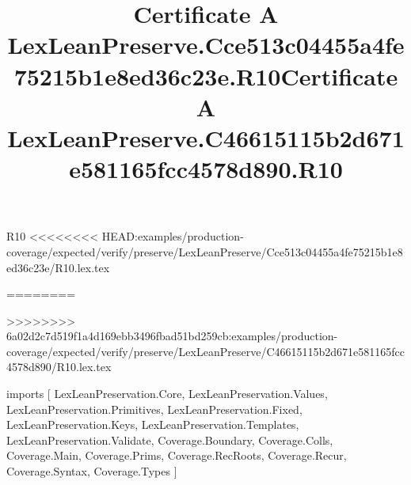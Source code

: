 \begin{lexlean}{R10}
<<<<<<<< HEAD:examples/production-coverage/expected/verify/preserve/LexLeanPreserve/Cce513c04455a4fe75215b1e8ed36c23e/R10.lex.tex
\title{Certificate A LexLeanPreserve.Cce513c04455a4fe75215b1e8ed36c23e.R10}
========
\title{Certificate A LexLeanPreserve.C46615115b2d671e581165fcc4578d890.R10}
>>>>>>>> 6a02d2c7d519f1a4d169ebb3496fbad51bd259cb:examples/production-coverage/expected/verify/preserve/LexLeanPreserve/C46615115b2d671e581165fcc4578d890/R10.lex.tex
\begin{coremodule}
imports [
  LexLeanPreservation.Core,
  LexLeanPreservation.Values,
  LexLeanPreservation.Primitives,
  LexLeanPreservation.Fixed,
  LexLeanPreservation.Keys,
  LexLeanPreservation.Templates,
  LexLeanPreservation.Validate,
  Coverage.Boundary,
  Coverage.Colls,
  Coverage.Main,
  Coverage.Prims,
  Coverage.RecRoots,
  Coverage.Recur,
  Coverage.Syntax,
  Coverage.Types
]


\end{coremodule}
\end{lexlean}
